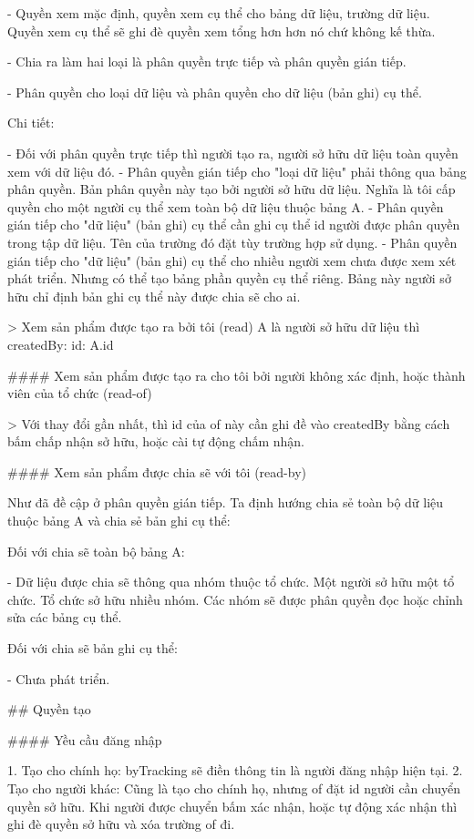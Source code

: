 - Quyền xem mặc định, quyền xem cụ thể cho bảng dữ liệu, trường dữ liệu. Quyền xem cụ thể sẽ ghi đè quyền xem tổng hơn hơn nó chứ không kế thừa.

- Chia ra làm hai loại là phân quyền trực tiếp và phân quyền gián tiếp.

- Phân quyền cho loại dữ liệu và phân quyền cho dữ liệu (bản ghi) cụ thể.

Chi tiết:

- Đối với phân quyền trực tiếp thì người tạo ra, người sở hữu dữ liệu toàn quyền xem với dữ liệu đó.
- Phân quyền gián tiếp cho "loại dữ liệu" phải thông qua bảng phân quyền. Bản phân quyền này tạo bởi người sở hữu dữ liệu. Nghĩa là tôi cấp quyền cho một người cụ thể xem toàn bộ dữ liệu thuộc bảng A.
- Phân quyền gián tiếp cho "dữ liệu" (bản ghi) cụ thể cần ghi cụ thể id người được phân quyền trong tập dữ liệu. Tên của trường đó đặt tùy trường hợp sử dụng.
- Phân quyền gián tiếp cho "dữ liệu" (bản ghi) cụ thể cho nhiều người xem chưa được xem xét phát triển. Nhưng có thể tạo bảng phần quyền cụ thể riêng. Bảng này người sở hữu chỉ định bản ghi cụ thể này được chia sẽ cho ai.

> Xem sản phẩm được tạo ra bởi tôi (read) A là người sở hữu dữ liệu thì createdBy: { id: A.id }



\#\#\#\# Xem sản phẩm được tạo ra cho tôi bởi người không xác định, hoặc thành viên của tổ chức (read-of)



> Với thay đổi gần nhất, thì id của of này cần ghi đề vào createdBy bằng cách bấm chấp nhận sở hữu, hoặc cài tự động chấm nhận.

\#\#\#\# Xem sản phẩm được chia sẽ với tôi (read-by)

Như đã đề cập ở phân quyền gián tiếp. Ta định hướng chia sẻ toàn bộ dữ liệu thuộc bảng A và chia sẻ bản ghi cụ thể:

Đối với chia sẽ toàn bộ bảng A:

- Dữ liệu được chia sẽ thông qua nhóm thuộc tổ chức.
Một người sở hữu một tổ chức. Tổ chức sở hữu nhiều nhóm.
Các nhóm sẽ được phân quyền đọc hoặc chỉnh sửa các bảng cụ thể.

Đối với chia sẽ bản ghi cụ thể:

- Chưa phát triển.

\#\# Quyền tạo

\#\#\#\# Yều cầu đăng nhập

1. Tạo cho chính họ:
byTracking sẽ điền thông tin là người đăng nhập hiện tại.
2. Tạo cho người khác:
Cũng là tạo cho chính họ, nhưng of đặt id người cần chuyển quyền sở hữu. Khi người được chuyển bấm xác nhận, hoặc tự động xác nhận thì ghi đè quyền sở hữu và xóa trường of đi.

